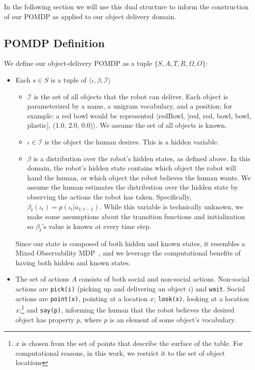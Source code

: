 \documentclass[conference]{IEEEtran}
\newcommand{\Iota}{\mathcal{I}}
\begin{document}
In the following section we will use this dual structure to inform the construction of our POMDP as applied to our object delivery domain. 


\subsection{POMDP Definition}

We define our object-delivery POMDP as a tuple $\{S, A, T, R, \Omega, O\}$: 

\begin{itemize}
	\item Each $s \in S$ is a tuple of $\langle \iota, \beta, \Iota \rangle$		\begin{itemize}
			\item $\Iota$ is the set of all objects that the robot can deliver. Each object is parameterized by a name, a unigram vocabulary, and a position; for example: a red bowl would be represented $\langle$redBowl, [red, red, bowl, bowl, plastic], (1.0, 2.0, 0.0)$\rangle$. We assume the set of all objects is known. 
			\item $\iota \in \Iota$ is the object the human desires. This is a hidden variable. 
			\item $\beta$ is a distribution over the robot's hidden states, as defined above. In this domain, the robot's hidden state contains which object the robot will hand the human, or which object the robot believes the human wants. We assume the human estimates the distribution over the hidden state by observing the actions the robot has taken. Specifically, $\beta_t(\iota_t) = p(\iota_t | a_{1:t-1})$. While this variable is technically unknown, we make some assumptions about the transition functions and initialization so $\beta_t$'s value is known at every time step. 
		\end{itemize}
		Since our state is composed of both hidden and known states, it resembles a Mixed Observability MDP~\citep{momdp}, and we leverage the computational benefits of having both hidden and known states. 
	\item The set of actions $A$ consists of both social and non-social actions. Non-social actions are \texttt{pick(i)} (picking up  and delivering an object $i$) and \texttt{wait}. Social actions are \texttt{point(x)}, pointing at a location $x$; \texttt{look(x)}, looking at a location $x$;\footnote{$x$ is chosen from the set of points that describe the surface of the table. For computational reasons, in this work, we restrict it to the set of object locations} and \texttt{say(p)}, informing the human that the robot believes the desired object has property $p$, where $p$ is an element of some object's vocabulary. 

\end{itemize}
\end{document}
